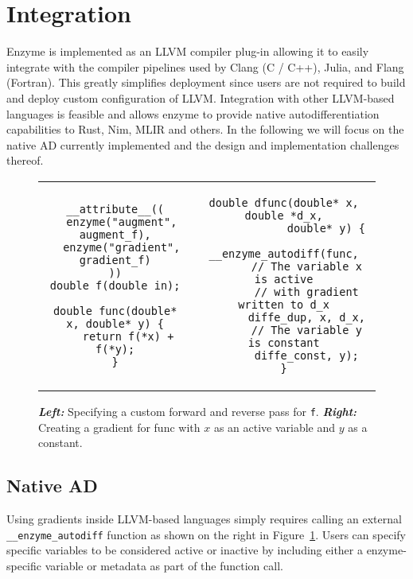 \section{Integration}
\label{sec:integration}


Enzyme is implemented as an LLVM compiler plug-in allowing it to easily integrate with the compiler pipelines used by Clang (C / C++), Julia, and Flang (Fortran).  This greatly simplifies deployment since users are not required to build and deploy custom configuration of LLVM. Integration with other LLVM-based languages is feasible and allows enzyme to provide native autodifferentiation capabilities to Rust, Nim, MLIR and others. In the following we will focus on the native AD currently implemented and the design and implementation challenges thereof.

\begin{figure}
    \centering
\begin{tabular}{c|c}
\begin{minipage}[T]{0.49\linewidth}
\begin{verbatim}
__attribute__((
  enzyme("augment", augment_f),
  enzyme("gradient", gradient_f)
))
double f(double in);

double func(double* x, double* y) {
    return f(*x) + f(*y);
}
\end{verbatim}
\end{minipage}
&
\begin{minipage}[T]{0.49\linewidth}
\begin{verbatim}
double dfunc(double* x, double *d_x,
             double* y) {
    __enzyme_autodiff(func,
       // The variable x is active
       // with gradient written to d_x
       diffe_dup, x, d_x,
       // The variable y is constant
       diffe_const, y);
}
\end{verbatim}
\end{minipage}
\end{tabular}
\caption{\textbf{\textit{Left:}} Specifying a custom forward and reverse pass for \texttt{f}. \textbf{\textit{Right:}} Creating a gradient for func with $x$ as an active variable and $y$ as a constant.}
    \label{fig:native}
\end{figure}

\subsection{Native AD}
\label{sec:native}
Using gradients inside LLVM-based languages simply requires calling an external \texttt{\_\_enzyme\_autodiff} function as shown on the right in Figure~\ref{fig:native}. Users can specify specific variables to be considered active or inactive by including either a enzyme-specific variable or metadata as part of the function call. 

